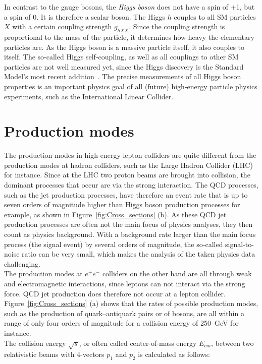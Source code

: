 In contrast to the gauge bosons, the \textit{Higgs boson} does not have a spin of +1, but a spin of 0.
It is therefore a scalar boson.
The Higgs $h$ couples to all SM particles $X$ with a certain coupling strength $g_{hXX}$.
Since the coupling strength is proportional to the mass of the particle, it determines how heavy the elementary particles are.
As the Higgs boson is a massive particle itself, it also couples to itself.
The so-called Higgs self-coupling, as well as all couplings to other SM particles are not well measured yet, since the Higgs discovery is the Standard Model's most recent addition~\cite{Higgs,Higgs2}.
The precise measurements of all Higgs boson properties is an important physics goal of all (future) high-energy particle physics experiments, such as the International Linear Collider. 

\section{Production modes}
\label{Production_modes}
The production modes in high-energy lepton colliders are quite different from the production modes at hadron colliders, such as the Large Hadron Collider (LHC) for instance.
Since at the LHC two proton beams are brought into collision, the dominant processes that occur are via the strong interaction.
The QCD processes, such as the jet production processes, have therefore an event rate that is up to seven orders of magnitude higher than Higgs boson production processes for example, as shown in Figure~\ref{fig:Cross_sections} (b).
As these QCD jet production processes are often not the main focus of physics analyses, they then count as physics background.
With a background rate larger than the main focus process (the signal event) by several orders of magnitude, the so-called signal-to-noise ratio can be very small, which makes the analysis of the taken physics data challenging.
\\The production modes at $e^+e^-$ colliders on the other hand are all through weak and electromagnetic interactions, since leptons can not interact via the strong force.
QCD jet production does therefore not occur at a lepton collider.
Figure~\ref{fig:Cross_sections} (a) shows that the rates of possible production modes, such as the production of quark--antiquark pairs or of bosons, are all within a range of only four orders of magnitude for a collision energy of \SI{250}{\GeV} for instance.
\\The collision energy $\sqrt{s}$, or often called center-of-mass energy $E_{cm}$, between two relativistic beams with 4-vectors $p_1$ and $p_2$ is calculated as follows:
